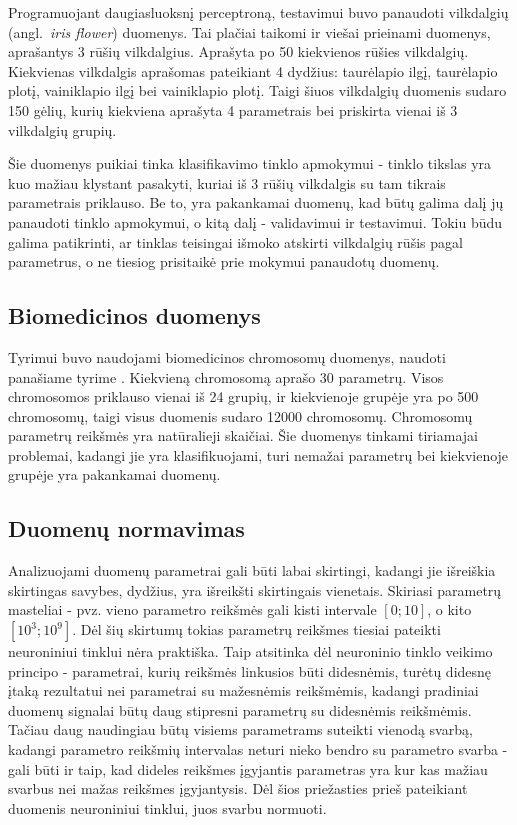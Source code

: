 \documentclass{VUMIFPSbakalaurinis}
\begin{document}
Programuojant daugiasluoksnį perceptroną, testavimui buvo panaudoti vilkdalgių (angl.~\textit{iris flower}) duomenys.
Tai plačiai taikomi ir viešai prieinami duomenys, aprašantys 3 rūšių vilkdalgius.
Aprašyta po 50 kiekvienos rūšies vilkdalgių.
Kiekvienas vilkdalgis aprašomas pateikiant 4 dydžius: taurėlapio ilgį, taurėlapio plotį, vainiklapio ilgį bei vainiklapio plotį.
Taigi šiuos vilkdalgių duomenis sudaro 150 gėlių, kurių kiekviena aprašyta 4 parametrais bei priskirta vienai iš 3 vilkdalgių grupių.

Šie duomenys puikiai tinka klasifikavimo tinklo apmokymui - tinklo tikslas yra kuo mažiau klystant pasakyti, kuriai iš 3 rūšių vilkdalgis su tam tikrais parametrais priklauso.
Be to, yra pakankamai duomenų, kad būtų galima dalį jų panaudoti tinklo apmokymui, o kitą dalį - validavimui ir testavimui.
Tokiu būdu galima patikrinti, ar tinklas teisingai išmoko atskirti vilkdalgių rūšis pagal parametrus, o ne tiesiog prisitaikė prie mokymui panaudotų duomenų.



\subsection{Biomedicinos duomenys}

Tyrimui buvo naudojami biomedicinos chromosomų duomenys, naudoti panašiame tyrime \cite[289~psl.]{price-dimensionality-reduction}.
Kiekvieną chromosomą aprašo 30 parametrų.
Visos chromosomos priklauso vienai iš 24 grupių, ir kiekvienoje grupėje yra po 500 chromosomų, taigi visus duomenis sudaro 12000 chromosomų.
Chromosomų parametrų reikšmės yra natūralieji skaičiai.
Šie duomenys tinkami tiriamajai problemai, kadangi jie yra klasifikuojami, turi nemažai parametrų bei kiekvienoje grupėje yra pakankamai duomenų.



\subsection{Duomenų normavimas}

Analizuojami duomenų parametrai gali būti labai skirtingi, kadangi jie išreiškia skirtingas savybes, dydžius, yra išreikšti skirtingais vienetais.
Skiriasi parametrų masteliai - pvz. vieno parametro reikšmės gali kisti intervale $[0; 10]$, o kito $[10^3; 10^9]$.
Dėl šių skirtumų tokias parametrų reikšmes tiesiai pateikti neuroniniui tinklui nėra praktiška.
Taip atsitinka dėl neuroninio tinklo veikimo principo - parametrai, kurių reikšmės linkusios būti didesnėmis, turėtų didesnę įtaką rezultatui nei parametrai su mažesnėmis reikšmėmis, kadangi pradiniai duomenų signalai būtų daug stipresni parametrų su didesnėmis reikšmėmis.
Tačiau daug naudingiau būtų visiems parametrams suteikti vienodą svarbą, kadangi parametro reikšmių intervalas neturi nieko bendro su parametro svarba - gali būti ir taip, kad dideles reikšmes įgyjantis parametras yra kur kas mažiau svarbus nei mažas reikšmes įgyjantysis.
Dėl šios priežasties prieš pateikiant duomenis neuroniniui tinklui, juos svarbu normuoti.
\end{document}
